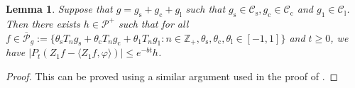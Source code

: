 \documentclass[12pt,a4paper]{amsart}
\theoremstyle{plain}
\newtheorem{lem}[thm]{Lemma}
\theoremstyle{definition}
\numberwithin{equation}{section}
\begin{document}
\section{}
\begin{lem}
	\label{lem:P:R}
	Suppose that $g = g_\mathrm s + g_\mathrm c + g_\mathrm l$ such that $g_\mathrm s \in \mathcal C_\mathrm s, g_\mathrm c \in \mathcal C_\mathrm c$ and $g_\mathrm 1 \in \mathcal C_\mathrm l$. 
	Then there exists $h \in \mathcal P^+$ such that for all $ f \in \overline {\mathcal P}_g := \{\theta_\mathrm s T_n g_\mathrm s +  \theta_\mathrm c T_n g_\mathrm c + \theta_\mathrm 1 T_n g_\mathrm 1: n \in \mathbb Z_+, \theta_\mathrm s, \theta_\mathrm c, \theta_\mathrm l \in [-1,1]\}$ and $t\geq 0$, we have $ | P_t (Z_1 f - \langle Z_1 f, \varphi \rangle )| \leq e^{-bt} h$.
\end{lem}
\begin{proof}
	This can be proved using a similar argument used in the proof of \cite[Lemma 2.9]{RenSongSunZhao2019Stable}.
\end{proof}
\end{document}
